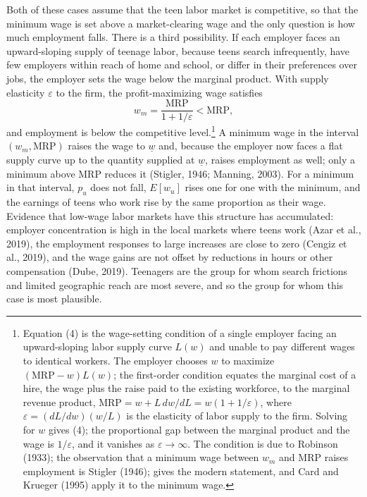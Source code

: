 \documentclass[12pt]{article}
\begin{document}
Both of these cases assume that the teen labor market is competitive, so that the minimum wage is set above a market-clearing wage and the only question is how much employment falls. There is a third possibility. If each employer faces an upward-sloping supply of teenage labor, because teens search infrequently, have few employers within reach of home and school, or differ in their preferences over jobs, the employer sets the wage below the marginal product. With supply elasticity $\varepsilon$ to the firm, the profit-maximizing wage satisfies
\begin{equation}
w_m = \frac{\text{MRP}}{1 + 1/\varepsilon} < \text{MRP},

\end{equation}
and employment is below the competitive level.\footnote{Equation (4) is the wage-setting condition of a single employer facing an upward-sloping labor supply curve $L(w)$ and unable to pay different wages to identical workers. The employer chooses $w$ to maximize $(\text{MRP} - w)L(w)$; the first-order condition equates the marginal cost of a hire, the wage plus the raise paid to the existing workforce, to the marginal revenue product, $\text{MRP} = w + L\,dw/dL = w(1 + 1/\varepsilon)$, where $\varepsilon = (dL/dw)(w/L)$ is the elasticity of labor supply to the firm. Solving for $w$ gives (4); the proportional gap between the marginal product and the wage is $1/\varepsilon$, and it vanishes as $\varepsilon \to \infty$. The condition is due to Robinson (1933); the observation that a minimum wage between $w_m$ and MRP raises employment is Stigler (1946); \citet[chapter 2]{manning2003} gives the modern statement, and Card and Krueger (1995) apply it to the minimum wage.} A minimum wage in the interval $(w_m, \text{MRP})$ raises the wage to $\underline{w}$ and, because the employer now faces a flat supply curve up to the quantity supplied at $\underline{w}$, raises employment as well; only a minimum above MRP reduces it (Stigler, 1946; Manning, 2003). For a minimum in that interval, $p_u$ does not fall, $E[w_u]$ rises one for one with the minimum, and the earnings of teens who work rise by the same proportion as their wage. Evidence that low-wage labor markets have this structure has accumulated: employer concentration is high in the local markets where teens work (Azar et al., 2019), the employment responses to large increases are close to zero (Cengiz et al., 2019), and the wage gains are not offset by reductions in hours or other compensation (Dube, 2019). Teenagers are the group for whom search frictions and limited geographic reach are most severe, and so the group for whom this case is most plausible.
\end{document}
